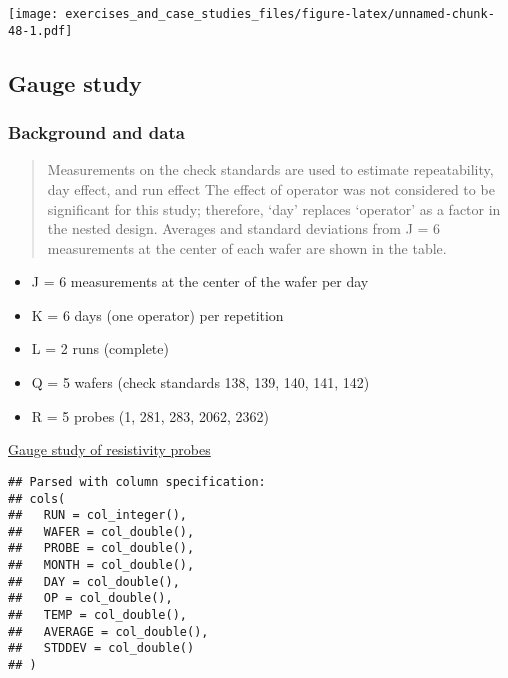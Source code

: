 \documentclass[]{book}
\newenvironment{Shaded}{\begin{snugshade}}{\end{snugshade}}
\newcommand{\DataTypeTok}[1]{\textcolor[rgb]{0.13,0.29,0.53}{#1}}
\newcommand{\KeywordTok}[1]{\textcolor[rgb]{0.13,0.29,0.53}{\textbf{#1}}}
\newcommand{\NormalTok}[1]{#1}
\newcommand{\OperatorTok}[1]{\textcolor[rgb]{0.81,0.36,0.00}{\textbf{#1}}}
\newcommand{\OtherTok}[1]{\textcolor[rgb]{0.56,0.35,0.01}{#1}}
\newcommand{\StringTok}[1]{\textcolor[rgb]{0.31,0.60,0.02}{#1}}
\providecommand{\tightlist}{%
  \setlength{\itemsep}{0pt}\setlength{\parskip}{0pt}}
\theoremstyle{definition}
\theoremstyle{definition}
\theoremstyle{definition}
\theoremstyle{remark}
\begin{document}
\texttt{[image: exercises\_and\_case\_studies\_files/figure-latex/unnamed-chunk-48-1.pdf]}

\hypertarget{gauge-study}{%
\subsection{Gauge study}\label{gauge-study}}

\hypertarget{background-and-data-1}{%
\subsubsection{Background and data}\label{background-and-data-1}}

\begin{quote}
Measurements on the check standards are used to estimate repeatability,
day effect, and run effect The effect of operator was not considered to
be significant for this study; therefore, `day' replaces `operator' as a
factor in the nested design. Averages and standard deviations from J = 6
measurements at the center of each wafer are shown in the table.
\end{quote}

\begin{itemize}
\tightlist
\item
  J = 6 measurements at the center of the wafer per day
\item
  K = 6 days (one operator) per repetition
\item
  L = 2 runs (complete)
\item
  Q = 5 wafers (check standards 138, 139, 140, 141, 142)
\item
  R = 5 probes (1, 281, 283, 2062, 2362)
\end{itemize}

\href{https://www.itl.nist.gov/div898/handbook/mpc/section6/mpc61.htm}{Gauge
study of resistivity probes}

\begin{Shaded}
\end{Shaded}

\begin{verbatim}
## Parsed with column specification:
## cols(
##   RUN = col_integer(),
##   WAFER = col_double(),
##   PROBE = col_double(),
##   MONTH = col_double(),
##   DAY = col_double(),
##   OP = col_double(),
##   TEMP = col_double(),
##   AVERAGE = col_double(),
##   STDDEV = col_double()
## )
\end{verbatim}
\end{document}
